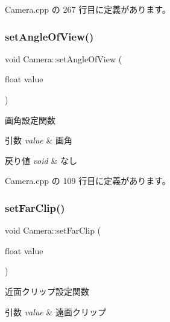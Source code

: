  Camera.\+cpp の 267 行目に定義があります。

\mbox{\label{class_camera_a8c9073240eb8385fec51d3ef185d3cee}} 
\subsubsection{\texorpdfstring{set\+Angle\+Of\+View()}{setAngleOfView()}}
{\footnotesize\ttfamily void Camera\+::set\+Angle\+Of\+View (\begin{DoxyParamCaption}\item[{float}]{value }\end{DoxyParamCaption})}



画角設定関数 


\begin{DoxyParams}{引数}
{\em value} & 画角 \\
\hline
\end{DoxyParams}

\begin{DoxyRetVals}{戻り値}
{\em void} & なし \\
\hline
\end{DoxyRetVals}


 Camera.\+cpp の 109 行目に定義があります。

\mbox{\label{class_camera_a1afa6c327f1f7d273c79acd55501c4ad}} 
\subsubsection{\texorpdfstring{set\+Far\+Clip()}{setFarClip()}}
{\footnotesize\ttfamily void Camera\+::set\+Far\+Clip (\begin{DoxyParamCaption}\item[{float}]{value }\end{DoxyParamCaption})}



近面クリップ設定関数 


\begin{DoxyParams}{引数}
{\em value} & 遠面クリップ \\
\hline
\end{DoxyParams}

